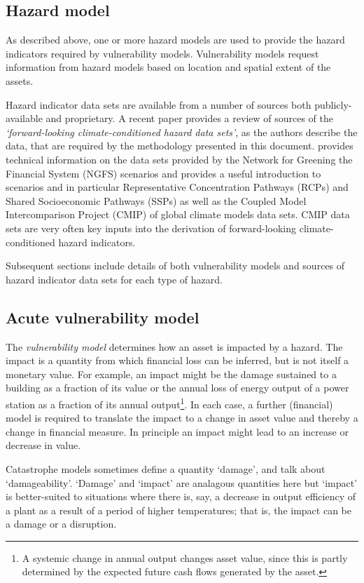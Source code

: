\documentclass[a4paper,11pt]{extarticle} %
\theoremstyle{definition}
\begin{document}
\subsection{Hazard model}
As described above, one or more hazard models are used to provide the hazard indicators required by vulnerability models. Vulnerability models request information from hazard models based on location and spatial extent of the assets.

Hazard indicator data sets are available from a number of sources both publicly-available and proprietary. A recent paper \cite{BavandiEtAl:2022} provides a review of sources of the \emph{`forward-looking climate-conditioned hazard data sets'}, as the authors describe the data, that are required by the methodology presented in this document. \cite{RichtersEtAl:2022} provides technical information on the data sets provided by the Network for Greening the Financial System (NGFS) scenarios and provides a useful introduction to scenarios and in particular Representative Concentration Pathways (RCPs) and Shared Socioeconomic Pathways (SSPs) as well as the Coupled Model Intercomparison Project (CMIP) of global climate models data sets. \gls{CMIP} data sets are very often key inputs into the derivation of forward-looking climate-conditioned hazard indicators.

Subsequent sections include details of both vulnerability models and sources of hazard indicator data sets for each type of hazard.

\subsection{Acute vulnerability model}
\label{SubSec:VulnerabilityModel}
The \emph{vulnerability model} determines how an asset is impacted by a hazard. The impact is a quantity from which financial loss can be inferred, but is not itself a monetary value. For example, an impact might be the damage sustained to a building as a fraction of its value or the annual loss of energy output of a power station as a fraction of its annual output\footnote{A systemic change in annual output changes asset value, since this is partly determined by the expected future cash flows generated by the asset.}. In each case, a further (financial) model is required to translate the impact to a change in asset value and thereby a change in financial measure. In principle an impact might lead to an increase or decrease in value.

Catastrophe models sometimes define a quantity `damage', and talk about `damageability'. `Damage' and `impact' are analagous quantities here but `impact' is better-suited to situations where there is, say, a decrease in output efficiency of a plant as a result of a period of higher temperatures; that is, the impact can be a damage or a disruption.
\end{document}
